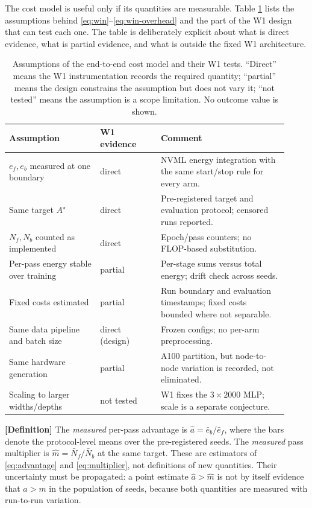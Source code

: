 The cost model is useful only if its quantities are measurable.  Table
\ref{tab:cost-assumptions} lists the assumptions behind
\eqref{eq:win}--\eqref{eq:win-overhead} and the part of the W1 design that can
test each one.  The table is deliberately explicit about what is direct
evidence, what is partial evidence, and what is outside the fixed W1
architecture.

\begin{table}[t]
\centering
\caption{Assumptions of the end-to-end cost model and their W1 tests.  ``Direct''
means the W1 instrumentation records the required quantity; ``partial'' means
the design constrains the assumption but does not vary it; ``not tested'' means
the assumption is a scope limitation.  No outcome value is shown.}
\label{tab:cost-assumptions}
\small
\begin{tabular}{@{}p{0.30\linewidth}p{0.20\linewidth}p{0.42\linewidth}@{}}
\toprule
Assumption & W1 evidence & Comment \\
\midrule
$e_f,e_b$ measured at one boundary
  & direct
  & NVML energy integration with the same start/stop rule for every arm. \\
Same target $A^\star$
  & direct
  & Pre-registered target and evaluation protocol; censored runs reported. \\
$N_f,N_b$ counted as implemented
  & direct
  & Epoch/pass counters; no FLOP-based substitution. \\
Per-pass energy stable over training
  & partial
  & Per-stage sums versus total energy; drift check across seeds. \\
Fixed costs estimated
  & partial
  & Run boundary and evaluation timestamps; fixed costs bounded where not separable. \\
Same data pipeline and batch size
  & direct (design)
  & Frozen configs; no per-arm preprocessing. \\
Same hardware generation
  & partial
  & A100 partition, but node-to-node variation is recorded, not eliminated. \\
Scaling to larger widths/depths
  & not tested
  & W1 fixes the $3\times2000$ MLP; scale is a separate conjecture. \\
\bottomrule
\end{tabular}
\end{table}

\textbf{[Definition]} The \emph{measured} per-pass advantage is
$\hat a=\bar e_b/\bar e_f$, where the bars denote the protocol-level means over
the pre-registered seeds.  The \emph{measured} pass multiplier is
$\hat m=\bar N_f/\bar N_b$ at the same target.  These are estimators of
\eqref{eq:advantage} and \eqref{eq:multiplier}, not definitions of new
quantities.  Their uncertainty must be propagated: a point estimate
$\hat a>\hat m$ is not by itself evidence that $a>m$ in the population of
seeds, because both quantities are measured with run-to-run variation.

